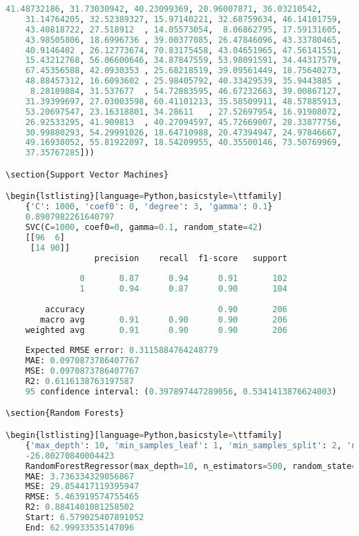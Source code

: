 \documentclass{article}
\begin{document}
\begin{lstlisting}[language=Python,basicstyle=\ttfamily]
    41.48732186, 31.73030942, 40.23099369, 20.96007871, 36.03210542,
    31.14764205, 32.52389327, 15.97140221, 32.68759634, 46.14101759,
    43.40818722, 27.518912  , 14.05573054,  8.06862795, 17.59131605,
    43.98505806, 18.6996736 , 39.00377085, 26.47846096, 43.33780465,
    40.9146402 , 26.12773674, 70.83175458, 43.04651965, 47.56141551,
    15.43212768, 56.06600646, 34.87847559, 53.98091591, 34.44317579,
    67.45356588, 42.0930353 , 25.68218519, 39.09561449, 18.75640273,
    48.88457312, 16.6093602 , 25.98405792, 40.33429539, 35.9443885 ,
     8.28189884, 31.537677  , 54.72883595, 46.67232663, 39.00867127,
    31.39399697, 27.03003598, 60.41101213, 35.58509911, 48.57885913,
    53.20697547, 23.16318801, 34.28611   , 27.52697954, 16.91908072,
    26.92533295, 41.909813  , 40.27094597, 45.72669007, 28.33877756,
    30.99880293, 54.29991026, 18.64710988, 20.47394947, 24.97846667,
    49.16938052, 55.81922097, 18.54209955, 40.35500146, 73.50769969,
    37.35767285]))

\section{Support Vector Machines}

\begin{lstlisting}[language=Python,basicstyle=\ttfamily]
    {'C': 1000, 'coef0': 0, 'degree': 3, 'gamma': 0.1}
    0.8907982261640797
    SVC(C=1000, coef0=0, gamma=0.1, random_state=42)
    [[96  6]
     [14 90]]
                  precision    recall  f1-score   support
    
               0       0.87      0.94      0.91       102
               1       0.94      0.87      0.90       104
    
        accuracy                           0.90       206
       macro avg       0.91      0.90      0.90       206
    weighted avg       0.91      0.90      0.90       206
    
    Expected RMSE error: 0.3115884764248779
    MAE: 0.0970873786407767
    MSE: 0.0970873786407767
    R2: 0.6116138763197587
    95 confidence interval: (0.397897447289056, 0.5341413876624003)

\section{Random Forests}

\begin{lstlisting}[language=Python,basicstyle=\ttfamily]
    {'max_depth': 10, 'min_samples_leaf': 1, 'min_samples_split': 2, 'n_estimators': 500}
    -26.80270840004423
    RandomForestRegressor(max_depth=10, n_estimators=500, random_state=42)
    MAE: 3.736334329056867
    MSE: 29.854417119395947
    RMSE: 5.463919574755465
    R2: 0.8841401081258502
    Start: 6.579025407891052
    End: 62.99933535147096


\end{lstlisting}
\end{document}
